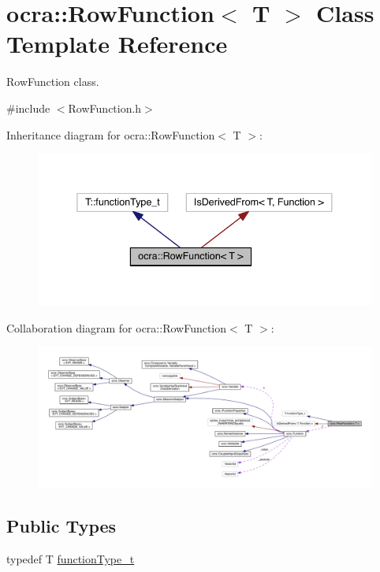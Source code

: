 \hypertarget{classocra_1_1RowFunction}{}\section{ocra\+:\+:Row\+Function$<$ T $>$ Class Template Reference}
\label{classocra_1_1RowFunction}


Row\+Function class.  




{\ttfamily \#include $<$Row\+Function.\+h$>$}



Inheritance diagram for ocra\+:\+:Row\+Function$<$ T $>$\+:\nopagebreak
\begin{figure}[H]
\begin{center}
\leavevmode
\includegraphics[width=338pt]{db/da9/classocra_1_1RowFunction__inherit__graph}
\end{center}
\end{figure}


Collaboration diagram for ocra\+:\+:Row\+Function$<$ T $>$\+:\nopagebreak
\begin{figure}[H]
\begin{center}
\leavevmode
\includegraphics[width=350pt]{d6/d3b/classocra_1_1RowFunction__coll__graph}
\end{center}
\end{figure}
\subsection*{Public Types}
\begin{DoxyCompactItemize}
\item 
typedef T \hyperlink{classocra_1_1RowFunction_a4b6faf57022f367fdcff681c2dc98306}{function\+Type\+\_\+t}
\end{DoxyCompactItemize}
